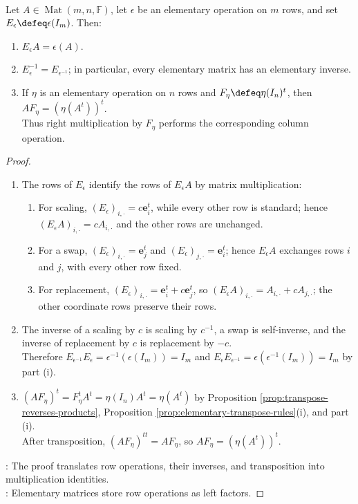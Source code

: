 \begin{proposition} \label{prop:elementary-matrices-perform-row-operations} \\
Let $A\in\operatorname{Mat}(m,n,\mathbb{F})$, let $\epsilon$ be an elementary operation on $m$ rows, and set $E_{\epsilon}\defeq\epsilon(I_m)$. Then:
\begin{enumerate}[label=(\roman*)]
\setlength{\itemsep}{0pt}
\item $E_{\epsilon}A=\epsilon(A)$.
\item $E_{\epsilon}^{-1}=E_{\epsilon^{-1}}$; in particular, every elementary matrix has an elementary inverse.
\item If $\eta$ is an elementary operation on $n$ rows and $F_{\eta}\defeq\eta(I_n)^t$, then $AF_{\eta}=(\eta(A^t))^t$.\\
Thus right multiplication by $F_{\eta}$ performs the corresponding column operation.
\end{enumerate}
\begin{proof}
\begin{enumerate}[label=(\roman*)]
\setlength{\itemsep}{0pt}
\item The rows of $E_{\epsilon}$ identify the rows of $E_{\epsilon}A$ by matrix multiplication:
\begin{enumerate}[label=(\alph*)]
\setlength{\itemsep}{0pt}
\item For scaling, $(E_{\epsilon})_{i,\cdot}=c\mathbf{e}_i^t$, while every other row is standard; hence $(E_{\epsilon}A)_{i,\cdot}=cA_{i,\cdot}$ and the other rows are unchanged.
\item For a swap, $(E_{\epsilon})_{i,\cdot}=\mathbf{e}_j^t$ and $(E_{\epsilon})_{j,\cdot}=\mathbf{e}_i^t$; hence $E_{\epsilon}A$ exchanges rows $i$ and $j$, with every other row fixed.
\item For replacement, $(E_{\epsilon})_{i,\cdot}=\mathbf{e}_i^t+c\mathbf{e}_j^t$, so $(E_{\epsilon}A)_{i,\cdot}=A_{i,\cdot}+cA_{j,\cdot}$; the other coordinate rows preserve their rows.
\end{enumerate}
\item The inverse of a scaling by $c$ is scaling by $c^{-1}$, a swap is self-inverse, and the inverse of replacement by $c$ is replacement by $-c$.\\
Therefore $E_{\epsilon^{-1}}E_{\epsilon}=\epsilon^{-1}(\epsilon(I_m))=I_m$ and $E_{\epsilon}E_{\epsilon^{-1}}=\epsilon(\epsilon^{-1}(I_m))=I_m$ by part (i).
\item $(AF_{\eta})^t=F_{\eta}^tA^t=\eta(I_n)A^t=\eta(A^t)$ by Proposition \ref{prop:transpose-reverses-products}, Proposition \ref{prop:elementary-transpose-rules}(i), and part (i).\\
After transposition, $(AF_{\eta})^{tt}=AF_{\eta}$, so $AF_{\eta}=(\eta(A^t))^t$.
\end{enumerate}
: The proof translates row operations, their inverses, and transposition into multiplication identities.\\
: Elementary matrices store row operations as left factors.
\end{proof}
\end{proposition}

